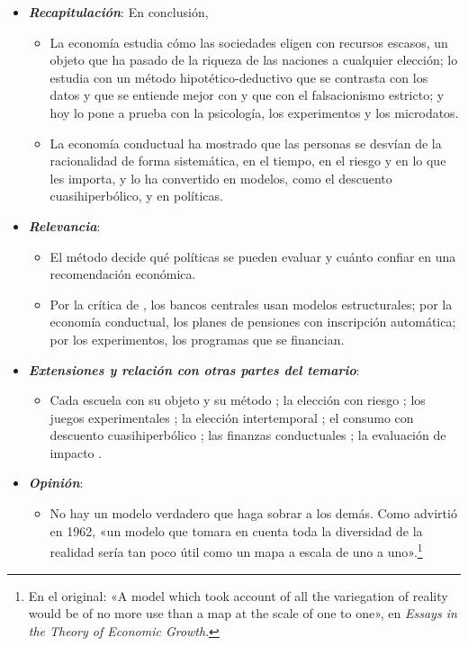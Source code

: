 \documentclass[11pt]{article}
\begin{document}
\begin{itemize}
\item \textbf{\emph{Recapitulación}}: En conclusión,
  \begin{itemize}
  \item La economía estudia cómo las sociedades eligen con recursos escasos, un objeto que ha pasado de la riqueza de las naciones a cualquier elección; lo estudia con un método hipotético-deductivo que se contrasta con los datos y que se entiende mejor con  y  que con el falsacionismo estricto; y hoy lo pone a prueba con la psicología, los experimentos y los microdatos.

  \item La economía conductual ha mostrado que las personas se desvían de la racionalidad de forma sistemática, en el tiempo, en el riesgo y en lo que les importa, y lo ha convertido en modelos, como el descuento cuasihiperbólico, y en políticas.
  \end{itemize}
\item \textbf{\emph{Relevancia}}:
  \begin{itemize}
  \item El método decide qué políticas se pueden evaluar y cuánto confiar en una recomendación económica.

  \item Por la crítica de , los bancos centrales usan modelos estructurales; por la economía conductual, los planes de pensiones con inscripción automática; por los experimentos, los programas que se financian.
  \end{itemize}
\item \textbf{\emph{Extensiones y relación con otras partes del temario}}:
  \begin{itemize}
  \item Cada escuela con su objeto y su método      ; la elección con riesgo ; los juegos experimentales ; la elección intertemporal ; el consumo con descuento cuasihiperbólico ; las finanzas conductuales ; la evaluación de impacto  .
  \end{itemize}
\item \textbf{\emph{Opinión}}:
  \begin{itemize}
  \item No hay un modelo verdadero que haga sobrar a los demás. Como advirtió  en 1962, «un modelo que tomara en cuenta toda la diversidad de la realidad sería tan poco útil como un mapa a escala de uno a uno».\footnote{En el original: «A model which took account of all the variegation of reality would be of no more use than a map at the scale of one to one», en \emph{Essays in the Theory of Economic Growth}\nocite{Robinson1962Essays}.}


\end{itemize}
\end{itemize}
\end{document}
